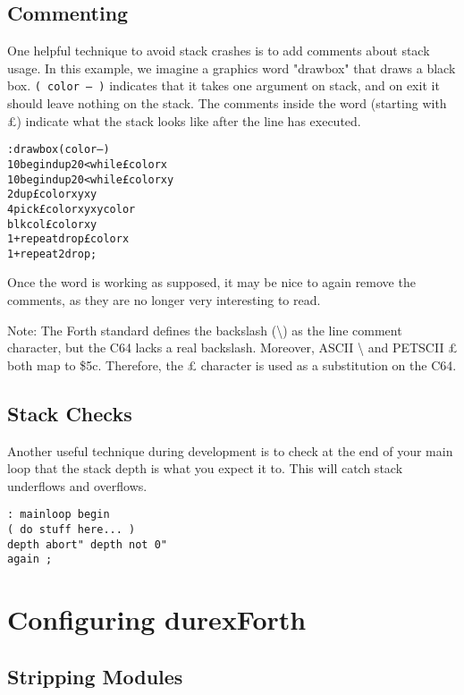 \subsection{Commenting}

One helpful technique to avoid stack crashes is to add comments about stack usage.
In this example, we imagine a graphics word "drawbox" that draws a black box.
\texttt{( color -- )} indicates that it takes one argument on stack, and on exit it should
leave nothing on the stack. The comments inside the word (starting with \pounds) indicate what the stack
looks like after the line has executed.

\begin{alltt}
: drawbox ( color -- )
10 begin dup 20 < while \pounds color x
10 begin dup 20 < while \pounds color x y
2dup \pounds color x y x y
4 pick \pounds color x y x y color
blkcol \pounds color x y
1+ repeat drop \pounds color x
1+ repeat 2drop ;
\end{alltt}

Once the word is working as supposed, it may be nice to again remove the comments, as
they are no longer very interesting to read.
\par{}\medskip{}
Note: The Forth standard defines the backslash (\textbackslash) as the line
comment character, but the C64 lacks a real backslash. Moreover, ASCII
\textbackslash{} and PETSCII \pounds{} both map to \${}5c. Therefore, the
\pounds{} character is used as a substitution on the C64.

\subsection{Stack Checks}

Another useful technique during development is to check at the end of your main loop
that the stack depth is what you expect it to. This will catch stack underflows
and overflows.

\begin{verbatim}
: mainloop begin
( do stuff here... )
depth abort" depth not 0"
again ;
\end{verbatim}

\section{Configuring durexForth}

\subsection{Stripping Modules}

